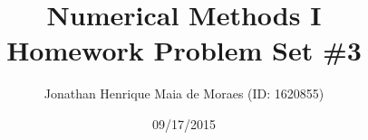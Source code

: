 \title{Numerical Methods I \\ Homework Problem Set \#3}
\author{Jonathan Henrique Maia de Moraes (ID: 1620855)}
\date{09/17/2015}
\maketitle